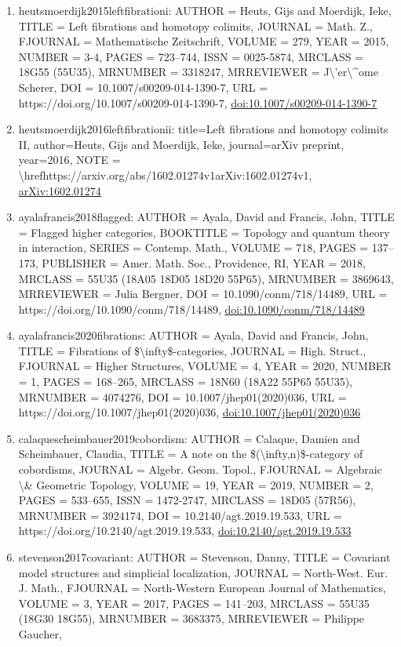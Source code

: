 \documentclass[11pt]{article}
\begin{document}
\begin{enumerate}[leftmargin=*]
  \item heutsmoerdijk2015leftfibrationi: AUTHOR = Heuts, Gijs and Moerdijk, Ieke, TITLE = Left fibrations and homotopy colimits, JOURNAL = Math. Z., FJOURNAL = Mathematische Zeitschrift, VOLUME = 279, YEAR = 2015, NUMBER = 3-4, PAGES = 723--744, ISSN = 0025-5874, MRCLASS = 18G55 (55U35), MRNUMBER = 3318247, MRREVIEWER = J\textbackslash{}'er\textbackslash{}\^{}ome Scherer, DOI = 10.1007/s00209-014-1390-7, URL = https://doi.org/10.1007/s00209-014-1390-7, \href{https://doi.org/10.1007/s00209-014-1390-7}{doi:10.1007/s00209-014-1390-7}
  \item heutsmoerdijk2016leftfibrationii: title=Left fibrations and homotopy colimits II, author=Heuts, Gijs and Moerdijk, Ieke, journal=arXiv preprint, year=2016, NOTE = \textbackslash{}hrefhttps://arxiv.org/abs/1602.01274v1arXiv:1602.01274v1, \href{https://arxiv.org/abs/1602.01274}{arXiv:1602.01274}
  \item ayalafrancis2018flagged: AUTHOR = Ayala, David and Francis, John, TITLE = Flagged higher categories, BOOKTITLE = Topology and quantum theory in interaction, SERIES = Contemp. Math., VOLUME = 718, PAGES = 137--173, PUBLISHER = Amer. Math. Soc., Providence, RI, YEAR = 2018, MRCLASS = 55U35 (18A05 18D05 18D20 55P65), MRNUMBER = 3869643, MRREVIEWER = Julia Bergner, DOI = 10.1090/conm/718/14489, URL = https://doi.org/10.1090/conm/718/14489, \href{https://doi.org/10.1090/conm/718/14489}{doi:10.1090/conm/718/14489}
  \item ayalafrancis2020fibrations: AUTHOR = Ayala, David and Francis, John, TITLE = Fibrations of \$\textbackslash{}infty\$-categories, JOURNAL = High. Struct., FJOURNAL = Higher Structures, VOLUME = 4, YEAR = 2020, NUMBER = 1, PAGES = 168--265, MRCLASS = 18N60 (18A22 55P65 55U35), MRNUMBER = 4074276, DOI = 10.1007/jhep01(2020)036, URL = https://doi.org/10.1007/jhep01(2020)036, \href{https://doi.org/10.1007/jhep01(2020)036}{doi:10.1007/jhep01(2020)036}
  \item calaquescheimbauer2019cobordism: AUTHOR = Calaque, Damien and Scheimbauer, Claudia, TITLE = A note on the \$(\textbackslash{}infty,n)\$-category of cobordisms, JOURNAL = Algebr. Geom. Topol., FJOURNAL = Algebraic \textbackslash{}\& Geometric Topology, VOLUME = 19, YEAR = 2019, NUMBER = 2, PAGES = 533--655, ISSN = 1472-2747, MRCLASS = 18D05 (57R56), MRNUMBER = 3924174, DOI = 10.2140/agt.2019.19.533, URL = https://doi.org/10.2140/agt.2019.19.533, \href{https://doi.org/10.2140/agt.2019.19.533}{doi:10.2140/agt.2019.19.533}
  \item stevenson2017covariant: AUTHOR = Stevenson, Danny, TITLE = Covariant model structures and simplicial localization, JOURNAL = North-West. Eur. J. Math., FJOURNAL = North-Western European Journal of Mathematics, VOLUME = 3, YEAR = 2017, PAGES = 141--203, MRCLASS = 55U35 (18G30 18G55), MRNUMBER = 3683375, MRREVIEWER = Philippe Gaucher,

\end{enumerate}
\end{document}
